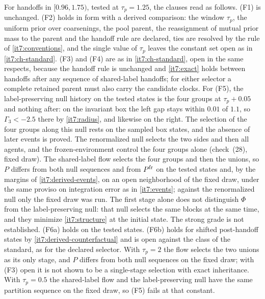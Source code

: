 \documentclass[11pt,letterpaper]{report}
\begin{document}
For handoffs in $[0.96,1.75)$, tested at $\tau_p=1.25$, the clauses read as follows. (F1) is unchanged. (F2) holds in form with a derived comparison: the window $\tau_p$, the uniform prior over coarsenings, the pool parent, the reassignment of mutual prior mass to the parent and the handoff rule are declared, ties are resolved by the rule of \cref{it7:conventions}, and the single value of $\tau_p$ leaves the constant set open as in \cref{it7:ch-standard}. (F3) and (F4) are as in \cref{it7:ch-standard}, open in the same respects, because the handoff rule is unchanged and \cref{it7:exact} holds between handoffs after any sequence of shared-label handoffs; for either selector a complete retained parent must also carry the candidate clocks. For (F5), the label-preserving null history on the tested states is the four groups at $\tau_p+0.05$ and nothing after: on the invariant box the left gap stays within $0.01$ of $1.1$, so $\Gamma_3<-2.5$ there by \cref{it7:radius}, and likewise on the right. The selection of the four groups along this null rests on the sampled box states, and the absence of later events is proved. The renormalized null selects the two sides and then all agents, and the frozen-environment control the four groups alone (check~(28), fixed draw). The shared-label flow selects the four groups and then the unions, so $P$ differs from both null sequences and from $P^{\rm fr}$ on the tested states and, by the margins of \cref{it7:derived-events}, on an open neighborhood of the fixed draw, under the same proviso on integration error as in \cref{it7:events}; against the renormalized null only the fixed draw was run. The first stage alone does not distinguish $\Phi$ from the label-preserving null: that null selects the same blocks at the same time, and they minimize \cref{it7:structure} at the initial state. The strong grade is not established. (F6a) holds on the tested states. (F6b) holds for shifted post-handoff states by \cref{it7:derived-counterfactual} and is open against the class of the standard, as for the declared selector. With $\tau_p=2$ the flow selects the two unions as its only stage, and $P$ differs from both null sequences on the fixed draw; with (F3) open it is not shown to be a single-stage selection with exact inheritance. With $\tau_p=0.5$ the shared-label flow and the label-preserving null have the same partition sequence on the fixed draw, so (F5) fails at that constant.
\end{document}
